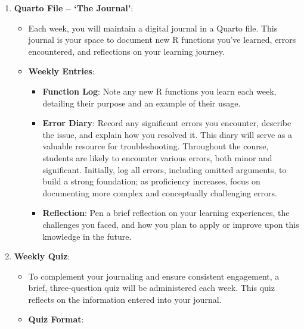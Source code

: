 \documentclass[
  11pt,
  letterpaper,
  DIV=11,
  numbers=noendperiod]{scrartcl}
\providecommand{\tightlist}{%
  \setlength{\itemsep}{0pt}\setlength{\parskip}{0pt}}\usepackage{longtable,booktabs,array}
\begin{document}
\begin{enumerate}
\def\labelenumi{\arabic{enumi}.}
\item
  \textbf{Quarto File -- `The Journal'}:

  \begin{itemize}
  \tightlist
  \item
    Each week, you will maintain a digital journal in a Quarto file.
    This journal is your space to document new R functions you've
    learned, errors encountered, and reflections on your learning
    journey.
  \item
    \textbf{Weekly Entries}:

    \begin{itemize}
    \tightlist
    \item
      \textbf{Function Log}: Note any new R functions you learn each
      week, detailing their purpose and an example of their usage.
    \item
      \textbf{Error Diary}: Record any significant errors you encounter,
      describe the issue, and explain how you resolved it. This diary
      will serve as a valuable resource for troubleshooting. Throughout
      the course, students are likely to encounter various errors, both
      minor and significant. Initially, log all errors, including
      omitted arguments, to build a strong foundation; as proficiency
      increases, focus on documenting more complex and conceptually
      challenging errors.
    \item
      \textbf{Reflection}: Pen a brief reflection on your learning
      experiences, the challenges you faced, and how you plan to apply
      or improve upon this knowledge in the future.
    \end{itemize}
  \end{itemize}
\item
  \textbf{Weekly Quiz}:

  \begin{itemize}
  \tightlist
  \item
    To complement your journaling and ensure consistent engagement, a
    brief, three-question quiz will be administered each week. This quiz
    reflects on the information entered into your journal.
  \item
    \textbf{Quiz Format}:


\end{itemize}
\end{enumerate}
\end{document}

